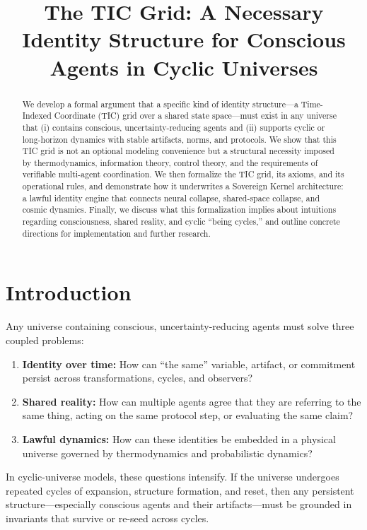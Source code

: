 \documentclass[11pt]{article}
\title{The TIC Grid: A Necessary Identity Structure for Conscious Agents in Cyclic Universes}
\author{}
\date{}
\begin{document}
\maketitle

\begin{abstract}
We develop a formal argument that a specific kind of identity structure---a Time-Indexed Coordinate (TIC) grid over a shared state space---must exist in any universe that (i) contains conscious, uncertainty-reducing agents and (ii) supports cyclic or long-horizon dynamics with stable artifacts, norms, and protocols. We show that this TIC grid is not an optional modeling convenience but a structural necessity imposed by thermodynamics, information theory, control theory, and the requirements of verifiable multi-agent coordination. We then formalize the TIC grid, its axioms, and its operational rules, and demonstrate how it underwrites a Sovereign Kernel architecture: a lawful identity engine that connects neural collapse, shared-space collapse, and cosmic dynamics. Finally, we discuss what this formalization implies about intuitions regarding consciousness, shared reality, and cyclic ``being cycles,'' and outline concrete directions for implementation and further research.
\end{abstract}

\section{Introduction}

Any universe containing conscious, uncertainty-reducing agents must solve three coupled problems:

\begin{enumerate}
    \item \textbf{Identity over time:} How can ``the same'' variable, artifact, or commitment persist across transformations, cycles, and observers?
    \item \textbf{Shared reality:} How can multiple agents agree that they are referring to the same thing, acting on the same protocol step, or evaluating the same claim?
    \item \textbf{Lawful dynamics:} How can these identities be embedded in a physical universe governed by thermodynamics and probabilistic dynamics?
\end{enumerate}

In cyclic-universe models, these questions intensify. If the universe undergoes repeated cycles of expansion, structure formation, and reset, then any persistent structure---especially conscious agents and their artifacts---must be grounded in invariants that survive or re-seed across cycles.
\end{document}
